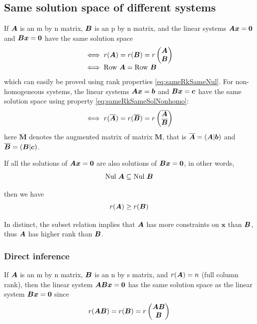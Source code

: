 \documentclass{overview}
\begin{document}
\subsection{Same solution space of different systems}

If $\boldsymbol{A}$ is an m by n matrix, $\boldsymbol{B}$ is an p by n matrix, and the linear
systems $\boldsymbol{A} \boldsymbol{x}=\boldsymbol{0}$ and $\boldsymbol{B} \boldsymbol{x}=\boldsymbol{0}$
have the same solution space
 \[
	 \begin{array}{l}
	\iff r(\boldsymbol{A}) = r(\boldsymbol{B}) = r\begin{pmatrix} \boldsymbol{A} \\ \boldsymbol{B} \\ \end{pmatrix} \\
	\iff \text{Row}\ \boldsymbol{A} = \text{Row}\ \boldsymbol{B}
	 \end{array}
\] 
which can easily be proved using rank properties \eqref{eq:sameRkSameNul}. For non-homogeneous
systems, the linear systems $\boldsymbol{A} \boldsymbol{x}=\boldsymbol{b}$ and $\boldsymbol{B} \boldsymbol{x}=\boldsymbol{c}$
have the same solution space using property \eqref{eq:sameRkSameSolNonhomo}:
 \[
	 \iff r(\overline{\boldsymbol{A}}) = r(\overline{\boldsymbol{B}}) 
	 = r\begin{pmatrix} \overline{\boldsymbol{A}} \\ \overline{\boldsymbol{B}} \\ \end{pmatrix}
\]
 here $\overline{\boldsymbol{M}}$ denotes the augmented matrix of matrix $\boldsymbol{M}$,
that is $\overline{\boldsymbol{A}} = (\boldsymbol{A} | \boldsymbol{b})$ and $\overline{\boldsymbol{B}} = (\boldsymbol{B} | \boldsymbol{c})$.


If all the solutions of $\boldsymbol{A} \boldsymbol{x}=\boldsymbol{0}$ are also solutions of
$\boldsymbol{B} \boldsymbol{x}=\boldsymbol{0}$, in other words,
\[
	\text{Nul}\ \A \subseteq \text{Nul}\ \B
\]

then we have
\[
	r(\boldsymbol{A}) \ge r(\boldsymbol{B}) \\
\] 

In distinct, the subset relation implies that $\boldsymbol{A}$ has more constraints on $\boldsymbol{x}$
than $\boldsymbol{B}$, thus $\boldsymbol{A}$ has higher rank than $\boldsymbol{B}$.

\subsubsection{Direct inference}


If $\boldsymbol{A}$ is an m by n matrix,  $\boldsymbol{B}$ is an n by s matrix, and  $r(\boldsymbol{A})=n$ (full column rank),
then the linear system
$\boldsymbol{A}\boldsymbol{B}\boldsymbol{x}=\boldsymbol{0}$ has the same solution space as the linear system $\boldsymbol{B}\boldsymbol{x}=\boldsymbol{0}$
since
\[
	r(\boldsymbol{A}\boldsymbol{B}) = r(\boldsymbol{B}) = r\begin{pmatrix} \boldsymbol{A}\boldsymbol{B} \\ \boldsymbol{B} \end{pmatrix}
\] 
\end{document}
